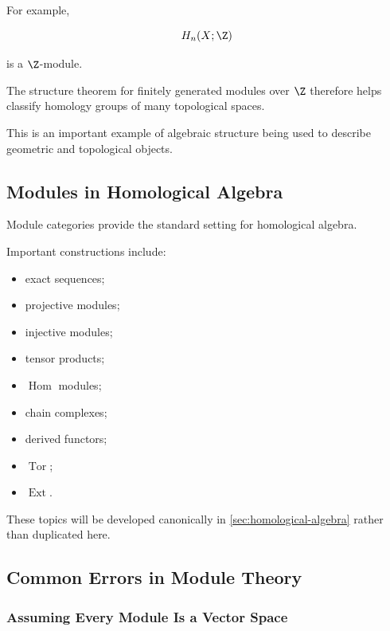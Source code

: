 For example,

\[ H_n(X;\Z) \]

is a \(\Z\)-module.

The structure theorem for finitely generated modules over \(\Z\) therefore
helps classify homology groups of many topological spaces.

This is an important example of algebraic structure being used to describe
geometric and topological objects.

\subsection{Modules in Homological Algebra}
\label{subsec:modules-homological-algebra}

Module categories provide the standard setting for homological algebra.

Important constructions include:

\begin{itemize}
    \item exact sequences;
    \item projective modules;
    \item injective modules;
    \item tensor products;
    \item \(\operatorname{Hom}\) modules;
    \item chain complexes;
    \item derived functors;
    \item \(\operatorname{Tor}\);
    \item \(\operatorname{Ext}\).
\end{itemize}

These topics will be developed canonically in
\cref{sec:homological-algebra} rather than duplicated here.

\subsection{Common Errors in Module Theory}
\label{subsec:common-module-errors}

\subsubsection{Assuming Every Module Is a Vector Space}

